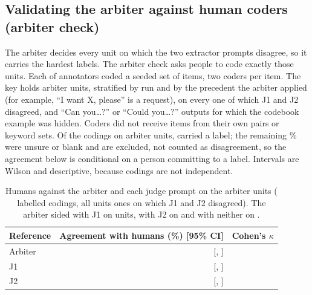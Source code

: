 \subsection{Validating the arbiter against human coders (arbiter check)}\label{sec:m-arbiter}

The arbiter decides every unit on which the two extractor prompts disagree, so it carries the hardest labels.
The arbiter check asks people to code exactly those units.
Each of \jmpOneNinePeople{} annotators coded a seeded set of items, two coders per item.
The key holds \jmpOneNineArbItems{} arbiter units, stratified by run and by the precedent the arbiter applied (for example, ``I want X, please'' is a request), on every one of which J1 and J2 disagreed, and \jmpOneNineCanYouItems{} ``Can you\ldots?'' or ``Could you\ldots?'' outputs for which the codebook example was hidden.
Coders did not receive items from their own pairs or keyword sets.
Of the \jmpOneNineArbExpected{} codings on arbiter units, \jmpOneNineArbLabelledN{} carried a label; the remaining \jmpOneNineArbUnlabelledShare{}\% were unsure or blank and are excluded, not counted as disagreement, so the agreement below is conditional on a person committing to a label.
Intervals are Wilson and descriptive, because codings are not independent.

\begin{table}[t]
\caption{Humans against the arbiter and each judge prompt on the \jmpOneNineArbItems{} arbiter units (\jmpOneNineCodings{} labelled codings, all units ones on which J1 and J2 disagreed). The arbiter sided with J1 on \jmpOneNineSidedJOne{} units, with J2 on \jmpOneNineSidedJTwo{} and with neither on \jmpOneNineSidedNeither{}.}
\label{tab:arbiter}
\small
\begin{tabular}{@{}l r r@{}}
\toprule
Reference & Agreement with humans (\%) [95\% CI] & Cohen's $\kappa$\\
\midrule
Arbiter & \jmpOneNineAgreeArb{} [\jmpOneNineAgreeArbLo{}, \jmpOneNineAgreeArbHi{}] & \jmpOneNineKappaArb{}\\
J1 & \jmpOneNineAgreeJOne{} [\jmpOneNineAgreeJOneLo{}, \jmpOneNineAgreeJOneHi{}] & \jmpOneNineKappaJOne{}\\
J2 & \jmpOneNineAgreeJTwo{} [\jmpOneNineAgreeJTwoLo{}, \jmpOneNineAgreeJTwoHi{}] & \jmpOneNineKappaJTwo{}\\
\bottomrule
\end{tabular}
\end{table}

